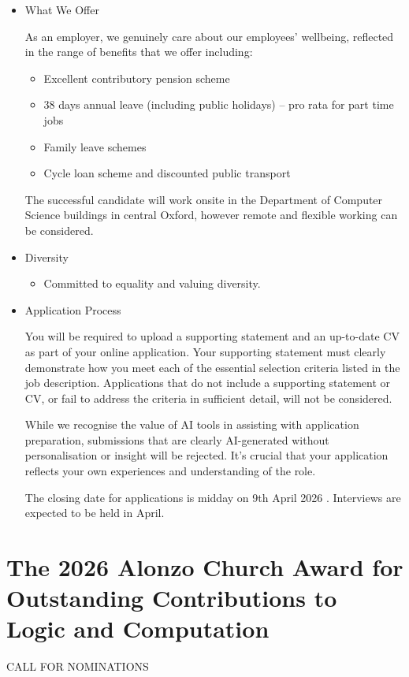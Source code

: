 \documentclass[prodmode,acmtecs]{acmsmall} %
\begin{document}
\begin{itemize}
  The Department of Computer Science at Oxford is renowned for pioneering research and teaching across diverse fields, consistently ranking among the best in the world. Our commitment to innovation drives us to tackle complex technological and societal challenges. 
 
\item  What We Offer 
 
  As an employer, we genuinely care about our employees’ wellbeing, reflected in the range of benefits that we offer including: 
 
\begin{itemize}\item  Excellent contributory pension scheme
\item  38 days annual leave (including public holidays) – pro rata for part time jobs
\item  Family leave schemes
\item  Cycle loan scheme and discounted public transport
\end{itemize} 
  The successful candidate will work onsite in the Department of Computer Science buildings in central Oxford, however remote and flexible working can be considered. 
 
\item  Diversity 
 
\begin{itemize}\item  Committed to equality and valuing diversity.
\end{itemize} 
\item  Application Process 
 
  You will be required to upload a supporting statement and an up-to-date CV as part of your online application. Your supporting statement must clearly demonstrate how you meet each of the essential selection criteria listed in the job description. Applications that do not include a supporting statement or CV, or fail to address the criteria in sufficient detail, will not be considered. 
 
  While we recognise the value of AI tools in assisting with application preparation, submissions that are clearly AI-generated without personalisation or insight will be rejected. It's crucial that your application reflects your own experiences and understanding of the role. 
 
 The closing date for applications is midday on 9th April 2026 . Interviews are expected to be held in April. 
 
\end{itemize}\section{The 2026 Alonzo Church Award for Outstanding Contributions to Logic and Computation}\label{The2026AlonzoChurchAwardforOutstandingContributionstoLogicandComputation}CALL FOR NOMINATIONS 
\end{document}
